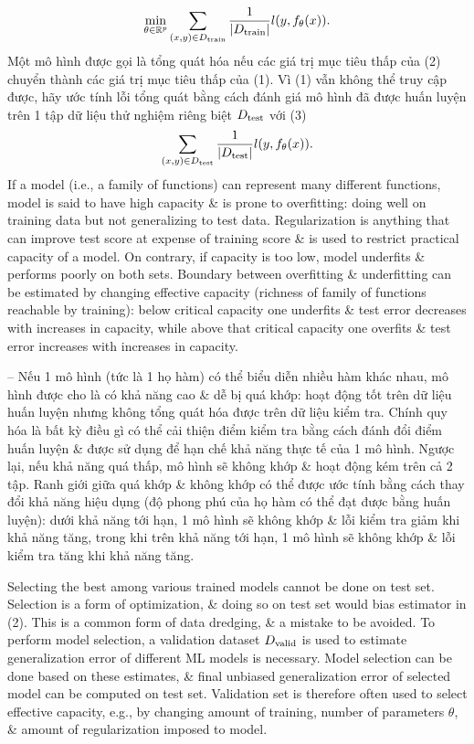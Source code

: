 \documentclass{article}
\begin{document}
\begin{itemize}
\begin{itemize}
\begin{itemize}
            \begin{equation*}
                \min_{\theta\in\mathbb{R}^p}\sum_{(x,y)\in D_{\rm train}} \frac{1}{|D_{\rm train}|}l(y,f_\theta(x)).
            \end{equation*}
            Một mô hình được gọi là tổng quát hóa nếu các giá trị mục tiêu thấp của (2) chuyển thành các giá trị mục tiêu thấp của (1). Vì (1) vẫn không thể truy cập được, hãy ước tính lỗi tổng quát bằng cách đánh giá mô hình đã được huấn luyện trên 1 tập dữ liệu thử nghiệm riêng biệt $D_{\rm test}$ với (3)
            \begin{equation*}
                \sum_{(x,y)\in D_{\rm test}} \frac{1}{|D_{\rm test}|}l(y,f_\theta(x)).
            \end{equation*}
            If a model (i.e., a family of functions) can represent many different functions, model is said to have high capacity \& is prone to overfitting: doing well on training data but not generalizing to test data. Regularization is anything that can improve test score at expense of training score \& is used to restrict practical capacity of a model. On contrary, if capacity is too low, model underfits \& performs poorly on both sets. Boundary between overfitting \& underfitting can be estimated by changing effective capacity (richness of family of functions reachable by training): below critical capacity one underfits \& test error decreases with increases in capacity, while above that critical capacity one overfits \& test error increases with increases in capacity.

            -- Nếu 1 mô hình (tức là 1 họ hàm) có thể biểu diễn nhiều hàm khác nhau, mô hình được cho là có khả năng cao \& dễ bị quá khớp: hoạt động tốt trên dữ liệu huấn luyện nhưng không tổng quát hóa được trên dữ liệu kiểm tra. Chính quy hóa là bất kỳ điều gì có thể cải thiện điểm kiểm tra bằng cách đánh đổi điểm huấn luyện \& được sử dụng để hạn chế khả năng thực tế của 1 mô hình. Ngược lại, nếu khả năng quá thấp, mô hình sẽ không khớp \& hoạt động kém trên cả 2 tập. Ranh giới giữa quá khớp \& không khớp có thể được ước tính bằng cách thay đổi khả năng hiệu dụng (độ phong phú của họ hàm có thể đạt được bằng huấn luyện): dưới khả năng tới hạn, 1 mô hình sẽ không khớp \& lỗi kiểm tra giảm khi khả năng tăng, trong khi trên khả năng tới hạn, 1 mô hình sẽ không khớp \& lỗi kiểm tra tăng khi khả năng tăng.

            Selecting the best among various trained models cannot be done on test set. Selection is a form of optimization, \& doing so on test set would bias estimator in (2). This is a common form of data dredging, \& a mistake to be avoided. To perform model selection, a validation dataset $D_{\rm valid}$ is used to estimate generalization error of different ML models is necessary. Model selection can be done based on these estimates, \& final unbiased generalization error of selected model can be computed on test set. Validation set is therefore often used to select effective capacity, e.g., by changing amount of training, number of parameters $\theta$, \& amount of regularization imposed to model.


\end{itemize}
\end{itemize}
\end{itemize}
\end{document}

